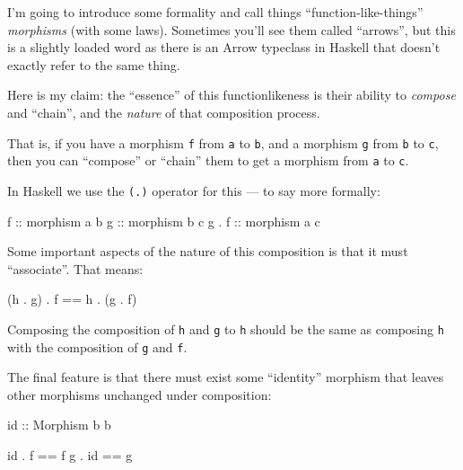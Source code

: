 \documentclass[]{article}
\newenvironment{Shaded}{}{}
\newcommand{\DataTypeTok}[1]{\textcolor[rgb]{0.56,0.13,0.00}{#1}}
\newcommand{\FunctionTok}[1]{\textcolor[rgb]{0.02,0.16,0.49}{#1}}
\newcommand{\NormalTok}[1]{#1}
\newcommand{\OtherTok}[1]{\textcolor[rgb]{0.00,0.44,0.13}{#1}}
\begin{document}
I'm going to introduce some formality and call things ``function-like-things''
\emph{morphisms} (with some laws). Sometimes you'll see them called ``arrows'',
but this is a slightly loaded word as there is an Arrow typeclass in Haskell
that doesn't exactly refer to the same thing.

Here is my claim: the ``essence'' of this functionlikeness is their ability to
\emph{compose} and ``chain'', and the \emph{nature} of that composition process.

That is, if you have a morphism \texttt{f} from \texttt{a} to \texttt{b}, and a
morphism \texttt{g} from \texttt{b} to \texttt{c}, then you can ``compose'' or
``chain'' them to get a morphism from \texttt{a} to \texttt{c}.

In Haskell we use the \texttt{(.)} operator for this --- to say more formally:

\begin{Shaded}
\begin{Highlighting}[]
\OtherTok{f     ::}\NormalTok{ morphism a b}
\OtherTok{g     ::}\NormalTok{ morphism b c}
\NormalTok{g }\FunctionTok{.}\OtherTok{ f ::}\NormalTok{ morphism a c}
\end{Highlighting}
\end{Shaded}

Some important aspects of the nature of this composition is that it must
``associate''. That means:

\begin{Shaded}
\begin{Highlighting}[]
\NormalTok{(h }\FunctionTok{.}\NormalTok{ g) }\FunctionTok{.}\NormalTok{ f }\FunctionTok{==}\NormalTok{ h }\FunctionTok{.}\NormalTok{ (g }\FunctionTok{.}\NormalTok{ f)}
\end{Highlighting}
\end{Shaded}

Composing the composition of \texttt{h} and \texttt{g} to \texttt{h} should be
the same as composing \texttt{h} with the composition of \texttt{g} and
\texttt{f}.

The final feature is that there must exist some ``identity'' morphism that
leaves other morphisms unchanged under composition:

\begin{Shaded}
\begin{Highlighting}[]
\NormalTok{id}\OtherTok{ ::} \DataTypeTok{Morphism}\NormalTok{ b b}

\NormalTok{id }\FunctionTok{.}\NormalTok{ f  }\FunctionTok{==}\NormalTok{ f}
\NormalTok{g  }\FunctionTok{.}\NormalTok{ id }\FunctionTok{==}\NormalTok{ g}
\end{Highlighting}
\end{Shaded}
\end{document}
